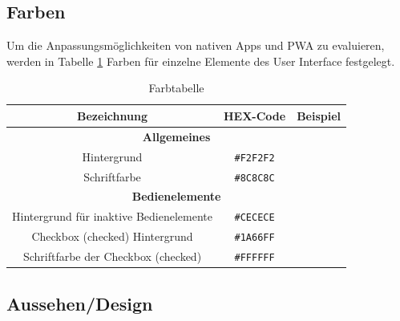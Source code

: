 \subsection{Farben}

Um die Anpassungsmöglichkeiten von nativen Apps und PWA zu evaluieren, werden in Tabelle \ref{tab:farbtabelle} Farben für einzelne Elemente des User Interface festgelegt.

\begin{table}
  \centering
    \begin{tabular}{ |c|c|c|}
     \hline
    \textbf{Bezeichnung} & \textbf{HEX-Code} & \textbf{Beispiel}\\
    \hline
    
    
    \hline
    \multicolumn{3}{|c|}{\textbf{Allgemeines}}\\
     \hline
    Hintergrund & \texttt{\#F2F2F2} &\cellcolor[HTML]{F2F2F2}\\
        \hline
         Schriftfarbe & \texttt{\#8C8C8C} &\cellcolor[HTML]{8C8C8C}\\
     \hline
     
     
      \hline
    \multicolumn{3}{|c|}{\textbf{Bedienelemente}}\\
     \hline
      Hintergrund für inaktive Bedienelemente & \texttt{\#CECECE} &\cellcolor[HTML]{CECECE}\\
     \hline
    Checkbox (checked) Hintergrund & \texttt{\#1A66FF} &\cellcolor[HTML]{1A66FF}\\
    \hline
     Schriftfarbe der Checkbox (checked) & \texttt{\#FFFFFF} &\cellcolor[HTML]{FFFFFF}\\
     \hline
    \end{tabular}
  \caption{Farbtabelle} \label{tab:farbtabelle}
\end{table}


\subsection{Aussehen/Design}



